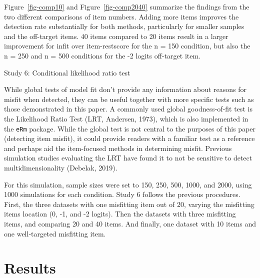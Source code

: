 \documentclass[
  letterpaper,
  DIV=11,
  numbers=noendperiod]{scrartcl}
\begin{document}
Figure~\ref{fig-comp10} and Figure~\ref{fig-comp2040} summarize the
findings from the two different comparisons of item numbers. Adding more
items improves the detection rate substantially for both methods,
particularly for smaller samples and the off-target items. 40 items
compared to 20 items result in a larger improvement for infit over
item-restscore for the n = 150 condition, but also the n = 250 and n =
500 conditions for the -2 logits off-target item.

Study 6: Conditional likelihood ratio test

While global tests of model fit don't provide any information about
reasons for misfit when detected, they can be useful together with more
specific tests such as those demonstrated in this paper. A commonly used
global goodness-of-fit test is the Likelihood Ratio Test (LRT, Andersen,
1973), which is also implemented in the \texttt{eRm} package. While the
global test is not central to the purposes of this paper (detecting item
misfit), it could provide readers with a familiar test as a reference
and perhaps aid the item-focused methods in determining misfit. Previous
simulation studies evaluating the LRT have found it to not be sensitive
to detect multidimensionality (Debelak, 2019).

For this simulation, sample sizes were set to 150, 250, 500, 1000, and
2000, using 1000 simulations for each condition. Study 6 follows the
previous procedures. First, the three datasets with one misfitting item
out of 20, varying the misfitting items location (0, -1, and -2 logits).
Then the datasets with three misfitting items, and comparing 20 and 40
items. And finally, one dataset with 10 items and one well-targeted
misfitting item.

\section{Results}\label{results-4}
\end{document}
